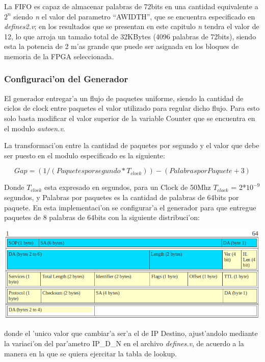 \documentclass[12pt,spanish]{article}
\begin{document}
La FIFO es capaz de almacenar palabras de 72bits en una cantidad equivalente a \textit{$2^n$}  siendo \textit{n}  el valor del parametro “AWIDTH”, que se encuentra especificado en \textit{defines2.v}; en los resultados que se presentan en este capitulo \textit{n} tendra el valor de 12, lo que arroja un tama\~no total de 32KBytes (4096 palabras de 72bits), siendo esta la potencia de 2 m'as grande que puede ser asignada en los bloques de memoria de la FPGA seleccionada.

\subsubsection{Configuraci'on del Generador}

El generador entregar'a un flujo de paquetes uniforme, siendo la cantidad de ciclos de clock entre paquetes el valor utilizado para regular dicho flujo. Para esto solo basta modificar el valor superior de la variable Counter que se encuentra en el modulo \textit{autoen.v}.

La transformaci'on entre la cantidad de paquetes por segundo y el valor que debe ser puesto en el modulo especificado es la siguiente:

\[  Gap=(1/(Paquetes por segundo * T_{clock})) - ( Palabras por Paquete + 3) \] 

Donde $T_{clock}$ esta expresado en segundos, para un Clock de 50Mhz $T_{clock}$   = 2*$10^{-9}$  segundos, y Palabras por paquetes es la cantidad de palabras de 64bits por paquete. En esta implementaci'on se configurar'a el generador para que entregue paquetes de 8 palabras de 64bits con la siguiente distribuci'on: 

\begin{center}
	\includegraphics[width=1\textwidth]{graf/frame.png}
\end{center}

donde el 'unico valor que cambiar'a ser'a el de IP Destino, ajust'andolo mediante la variaci'on del par'ametro IP\_D\_N en el archivo \textit{defines.v}, de acuerdo a la manera en la que se quiera ejercitar la tabla de lookup.
\end{document}

